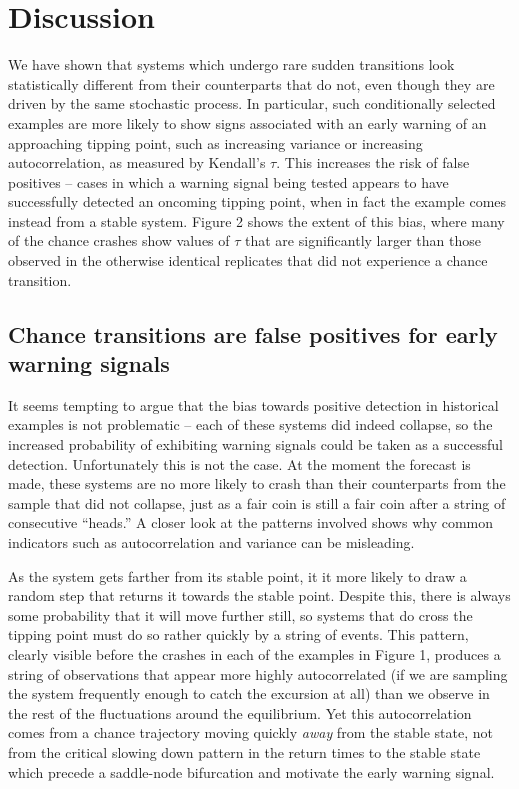 \documentclass[authoryear,5p]{elsarticle}
\begin{document}
\section{Discussion}


We have shown that systems which undergo rare sudden transitions look
statistically different from their counterparts that do not, even though
they are driven by the same stochastic process.  In particular, such
conditionally selected examples are more likely to show signs associated
with an early warning of an approaching tipping point, such as increasing
variance or increasing autocorrelation, as measured by Kendall's $\tau$.
This increases the risk of false positives -- cases in which a warning
signal being tested appears to have successfully detected an oncoming
tipping point, when in fact the example comes
instead from a stable system. Figure 2 shows the extent of this bias,
where many of the chance crashes show values of $\tau$ that are 
significantly larger than those observed in the otherwise identical
replicates that did not experience a chance transition.  


\subsection{Chance transitions are false positives for early warning signals}

It seems tempting to argue that the bias towards positive detection
in historical examples is not problematic -- each of these systems did
indeed collapse, so the increased probability
of exhibiting warning signals could be taken as a successful detection.
Unfortunately this is not the case. At the moment the forecast is made,
these systems are no more likely to crash than their counterparts from
the sample that did not collapse, just as a fair coin is still a fair
coin after a string of consecutive ``heads.''  A closer look at
the patterns involved shows why common indicators
such as autocorrelation and variance can be misleading.

As the system gets farther from its stable point, it it more likely to draw a random step that
returns it towards the stable point. Despite this, there is always some probability that
it will move further still, so systems that do cross the tipping point must do
so rather quickly by a string of events.  This pattern, clearly visible before the crashes in each of
the examples in Figure 1, produces a string of observations that appear
more highly autocorrelated (if we are sampling the system frequently
enough to catch the excursion at all) than we observe in the rest of the
fluctuations around the equilibrium.  Yet this autocorrelation comes from
a chance trajectory moving quickly \emph{away} from the stable state,
not from the critical slowing down pattern in the return times to the
stable state which precede a saddle-node bifurcation and motivate the
early warning signal.
\end{document}
